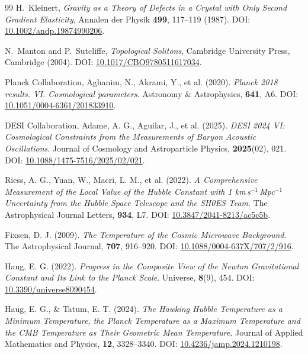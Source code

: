 \documentclass[10pt,a4paper]{article}
\begin{document}
\begin{thebibliography}{99}
	H.~Kleinert,
	\textit{Gravity as a Theory of Defects in a Crystal with Only Second Gradient Elasticity},
	Annalen der Physik \textbf{499}, 117--119 (1987).
	DOI: \href{https://doi.org/10.1002/andp.19874990206}{10.1002/andp.19874990206}.
	
	N.~Manton and P.~Sutcliffe,
	\textit{Topological Solitons},
	Cambridge University Press, Cambridge (2004).
	DOI: \href{https://doi.org/10.1017/CBO9780511617034}{10.1017/CBO9780511617034}.
	
	Planck Collaboration, Aghanim, N., Akrami, Y., et al. (2020).
	\textit{Planck 2018 results. VI. Cosmological parameters}.
	Astronomy \& Astrophysics, \textbf{641}, A6.
	DOI: \href{https://doi.org/10.1051/0004-6361/201833910}{10.1051/0004-6361/201833910}.
	
	DESI Collaboration, Adame, A. G., Aguilar, J., et al. (2025).
	\textit{DESI 2024 VI: Cosmological Constraints from the Measurements of Baryon Acoustic Oscillations}.
	Journal of Cosmology and Astroparticle Physics, \textbf{2025}(02), 021.
	DOI: \href{https://doi.org/10.1088/1475-7516/2025/02/021}{10.1088/1475-7516/2025/02/021}.
	
	Riess, A. G., Yuan, W., Macri, L. M., et al. (2022).
	\textit{A Comprehensive Measurement of the Local Value of the Hubble Constant with 1 km\,s\(^{-1}\)\,Mpc\(^{-1}\) Uncertainty from the Hubble Space Telescope and the SH0ES Team}.
	The Astrophysical Journal Letters, \textbf{934}, L7.
	DOI: \href{https://doi.org/10.3847/2041-8213/ac5c5b}{10.3847/2041-8213/ac5c5b}.
	
	Fixsen, D. J. (2009).
	\textit{The Temperature of the Cosmic Microwave Background}.
	The Astrophysical Journal, \textbf{707}, 916--920.
	DOI: \href{https://doi.org/10.1088/0004-637X/707/2/916}{10.1088/0004-637X/707/2/916}.
	
	Haug, E. G. (2022).
	\textit{Progress in the Composite View of the Newton Gravitational Constant and Its Link to the Planck Scale}.
	Universe, \textbf{8}(9), 454.
	DOI: \href{https://doi.org/10.3390/universe8090454}{10.3390/universe8090454}.
	
	Haug, E. G., \& Tatum, E. T. (2024).
	\textit{The Hawking Hubble Temperature as a Minimum Temperature, the Planck Temperature as a Maximum Temperature and the CMB Temperature as Their Geometric Mean Temperature}.
	Journal of Applied Mathematics and Physics, \textbf{12}, 3328--3340.
	DOI: \href{https://doi.org/10.4236/jamp.2024.1210198}{10.4236/jamp.2024.1210198}.
	

\end{thebibliography}
\end{document}
